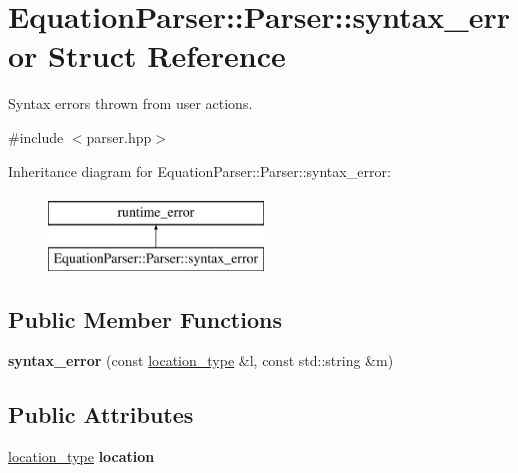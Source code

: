 \hypertarget{structEquationParser_1_1Parser_1_1syntax__error}{}\section{Equation\+Parser\+:\+:Parser\+:\+:syntax\+\_\+error Struct Reference}
\label{structEquationParser_1_1Parser_1_1syntax__error}


Syntax errors thrown from user actions.  




{\ttfamily \#include $<$parser.\+hpp$>$}

Inheritance diagram for Equation\+Parser\+:\+:Parser\+:\+:syntax\+\_\+error\+:\begin{figure}[H]
\begin{center}
\leavevmode
\includegraphics[height=2.000000cm]{structEquationParser_1_1Parser_1_1syntax__error}
\end{center}
\end{figure}
\subsection*{Public Member Functions}
\begin{DoxyCompactItemize}
\item 
{\bfseries syntax\+\_\+error} (const \hyperlink{classEquationParser_1_1Parser_a9c08ca33906dfb521b4ec5989e3620bf}{location\+\_\+type} \&l, const std\+::string \&m)\hypertarget{structEquationParser_1_1Parser_1_1syntax__error_a00d46855fc32f03ccd652f474d3b72ff}{}\label{structEquationParser_1_1Parser_1_1syntax__error_a00d46855fc32f03ccd652f474d3b72ff}

\end{DoxyCompactItemize}
\subsection*{Public Attributes}
\begin{DoxyCompactItemize}
\item 
\hyperlink{classEquationParser_1_1Parser_a9c08ca33906dfb521b4ec5989e3620bf}{location\+\_\+type} {\bfseries location}\hypertarget{structEquationParser_1_1Parser_1_1syntax__error_a2ed675b41cc29ee5864b24f6736ab809}{}\label{structEquationParser_1_1Parser_1_1syntax__error_a2ed675b41cc29ee5864b24f6736ab809}

\end{DoxyCompactItemize}


